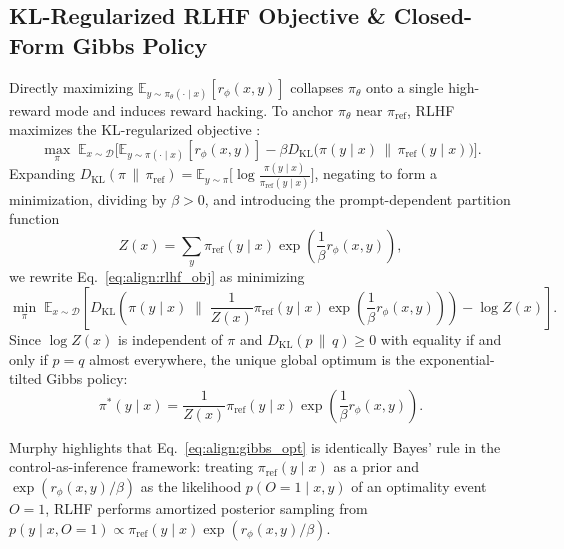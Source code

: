 \documentclass[../../../../master.tex]{subfiles}
\begin{document}
\subsection{KL-Regularized RLHF Objective \& Closed-Form Gibbs Policy}

\begin{coremath}
Directly maximizing $\mathbb{E}_{y \sim \pi_\theta(\cdot \mid x)}[r_\phi(x,y)]$ collapses $\pi_\theta$ onto a single high-reward mode and induces reward hacking. To anchor $\pi_\theta$ near $\pi_{\mathrm{ref}}$, RLHF maximizes the KL-regularized objective  :
\begin{equation}
\label{eq:align:rlhf_obj}
\max_{\pi} \; \mathbb{E}_{x \sim \mathcal{D}} \Big[ \mathbb{E}_{y \sim \pi(\cdot \mid x)}[r_\phi(x,y)] - \beta D_{\mathrm{KL}}\!\big(\pi(y \mid x) \,\|\, \pi_{\mathrm{ref}}(y \mid x)\big) \Big].
\end{equation}
Expanding $D_{\mathrm{KL}}(\pi \,\|\, \pi_{\mathrm{ref}}) = \mathbb{E}_{y \sim \pi}\big[\log \frac{\pi(y \mid x)}{\pi_{\mathrm{ref}}(y \mid x)}\big]$, negating to form a minimization, dividing by $\beta > 0$, and introducing the prompt-dependent partition function
\begin{equation}
\label{eq:align:partition}
Z(x) = \sum_{y} \pi_{\mathrm{ref}}(y \mid x) \exp\!\left(\frac{1}{\beta} r_\phi(x,y)\right),
\end{equation}
we rewrite Eq.~\eqref{eq:align:rlhf_obj} as minimizing
\begin{equation}
\label{eq:align:kl_equiv}
\min_{\pi} \; \mathbb{E}_{x \sim \mathcal{D}} \!\left[ D_{\mathrm{KL}}\!\left( \pi(y \mid x) \;\Big\|\; \frac{1}{Z(x)} \pi_{\mathrm{ref}}(y \mid x) \exp\!\left(\frac{1}{\beta} r_\phi(x,y)\right) \right) - \log Z(x) \right].
\end{equation}
Since $\log Z(x)$ is independent of $\pi$ and $D_{\mathrm{KL}}(p \,\|\, q) \ge 0$ with equality if and only if $p = q$ almost everywhere, the unique global optimum is the exponential-tilted Gibbs policy:
\begin{equation}
\label{eq:align:gibbs_opt}
\pi^*(y \mid x) = \frac{1}{Z(x)} \pi_{\mathrm{ref}}(y \mid x) \exp\!\left(\frac{1}{\beta} r_\phi(x,y)\right).
\end{equation}
\end{coremath}

\begin{intuition}
Murphy  highlights that Eq.~\eqref{eq:align:gibbs_opt} is identically Bayes' rule in the control-as-inference framework: treating $\pi_{\mathrm{ref}}(y \mid x)$ as a prior and $\exp(r_\phi(x,y)/\beta)$ as the likelihood $p(O=1 \mid x,y)$ of an optimality event $O=1$, RLHF performs amortized posterior sampling from $p(y \mid x, O=1) \propto \pi_{\mathrm{ref}}(y \mid x)\exp(r_\phi(x,y)/\beta)$.
\end{intuition}
\end{document}
